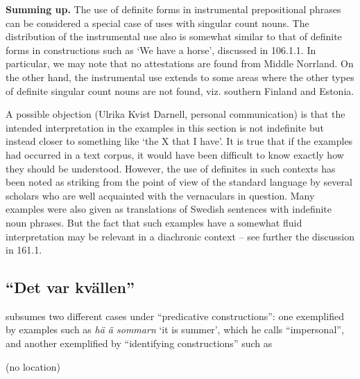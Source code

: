 \begin{styleBodytextC}
\textbf{Summing up.} The use of definite forms in instrumental prepositional phrases can be considered a special case of uses with singular count nouns. The distribution of the instrumental use also is somewhat similar to that of definite forms in constructions such as ‘We have a horse’, discussed in 106.1.1. In particular, we may note that no attestations are found from Middle Norrland. On the other hand, the instrumental use extends to some areas where the other types of definite singular count nouns are not found, viz. southern Finland and Estonia. 

\end{styleBodytextC}

\begin{styleBodytextC}
A possible objection (Ulrika Kvist Darnell, personal communication) is that the intended interpretation in the examples in this section is not indefinite but instead closer to something like ‘the X that I have’. It is true that if the examples had occurred in a text corpus, it would have been difficult to know exactly how they should be understood. However, the use of definites in such contexts has been noted as striking from the point of view of the standard language by several scholars who are well acquainted with the vernaculars in question. Many examples were also given as translations of Swedish sentences with indefinite noun phrases. But the fact that such examples have a somewhat fluid interpretation may be relevant in a diachronic context – see further the discussion in 161.1. 

\end{styleBodytextC}

\subsection{ “Det var kvällen”}
\label{bkm:Ref224379336}
\begin{styleBodyTextFirst}
\citet[16]{Delsing2003a} subsumes two different cases under “predicative constructions”: one exemplified by examples such as \textit{hä ä sommarn} ‘it is summer’, which he calls “impersonal”, and another exemplified by “identifying constructions” such as 

\end{styleBodyTextFirst}

\begin{listWWNumileveli}
\item {}

\begin{styleExample}
\label{bkm:Ref224115132}(no location)

\end{styleExample}

\end{listWWNumileveli}

